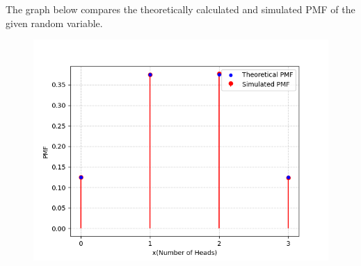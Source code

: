 \documentclass[journal]{IEEEtran}
\begin{document}
The graph below compares the theoretically calculated and simulated PMF of the given random variable.
\begin{figure}[htbp]
  \centering
  \includegraphics[width=\columnwidth]{figs/Fig1.png}
\end{figure}
\end{document}
